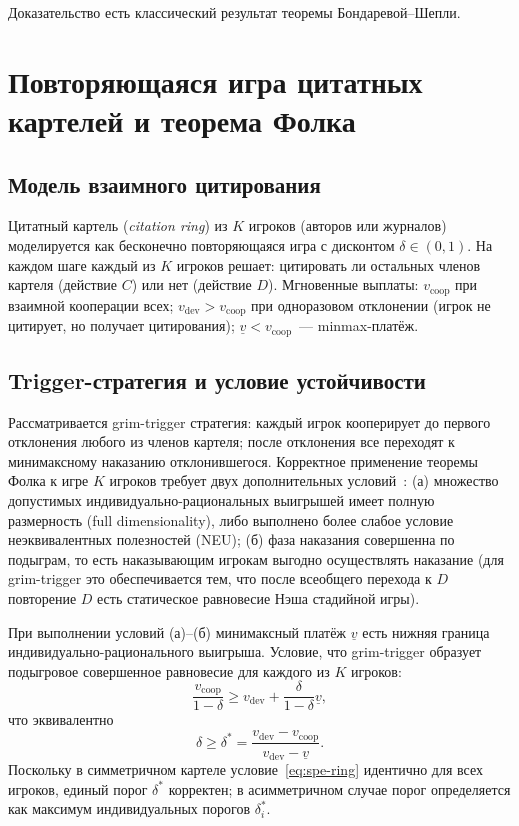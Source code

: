 \documentclass[12pt,a4paper]{article}
\theoremstyle{definition}
\begin{document}
Доказательство есть классический результат теоремы Бондаревой--Шепли.

\section{Повторяющаяся игра цитатных картелей и теорема Фолка}
\label{sec:citation-rings}

\subsection{Модель взаимного цитирования}

Цитатный картель (\emph{citation ring}) из $K$ игроков (авторов или
журналов) моделируется как бесконечно повторяющаяся игра с дисконтом
$\delta \in (0,1)$. На каждом шаге каждый из $K$ игроков решает:
цитировать ли остальных членов картеля (действие $C$) или нет
(действие $D$). Мгновенные выплаты: $v_{\mathrm{coop}}$ при взаимной
кооперации всех; $v_{\mathrm{dev}} > v_{\mathrm{coop}}$ при
одноразовом отклонении (игрок не цитирует, но получает цитирования);
$\underline{v} < v_{\mathrm{coop}}$~--- minmax-платёж.

\subsection{Trigger-стратегия и условие устойчивости}

Рассматривается grim-trigger стратегия: каждый игрок кооперирует до
первого отклонения любого из членов картеля; после отклонения все
переходят к минимаксному наказанию отклонившегося. Корректное
применение теоремы Фолка к игре $K$ игроков требует двух
дополнительных условий~\citep{fudenberg1986}: \textup{(а)} множество
допустимых индивидуально-рациональных выигрышей имеет полную
размерность (full dimensionality), либо выполнено более слабое
условие неэквивалентных полезностей (NEU); \textup{(б)} фаза
наказания совершенна по подыграм, то есть наказывающим игрокам
выгодно осуществлять наказание (для grim-trigger это обеспечивается
  тем, что после всеобщего перехода к $D$ повторение $D$ есть
статическое равновесие Нэша стадийной игры).

При выполнении условий (а)--(б) минимаксный платёж $\underline{v}$
есть нижняя граница индивидуально-рационального выигрыша. Условие,
что grim-trigger образует подыгровое совершенное равновесие для
каждого из $K$ игроков:
\begin{equation}
  \frac{v_{\mathrm{coop}}}{1 - \delta} \geq v_{\mathrm{dev}} +
  \frac{\delta}{1 - \delta} \underline{v},
  \label{eq:spe-ring}
\end{equation}
что эквивалентно
\begin{equation}
  \delta \geq \delta^{*} = \frac{v_{\mathrm{dev}} -
  v_{\mathrm{coop}}}{v_{\mathrm{dev}} - \underline{v}}.
  \label{eq:delta-star}
\end{equation}
Поскольку в симметричном картеле условие~\eqref{eq:spe-ring}
идентично для всех игроков, единый порог $\delta^*$ корректен; в
асимметричном случае порог определяется как максимум индивидуальных
порогов $\delta^*_i$.
\end{document}
